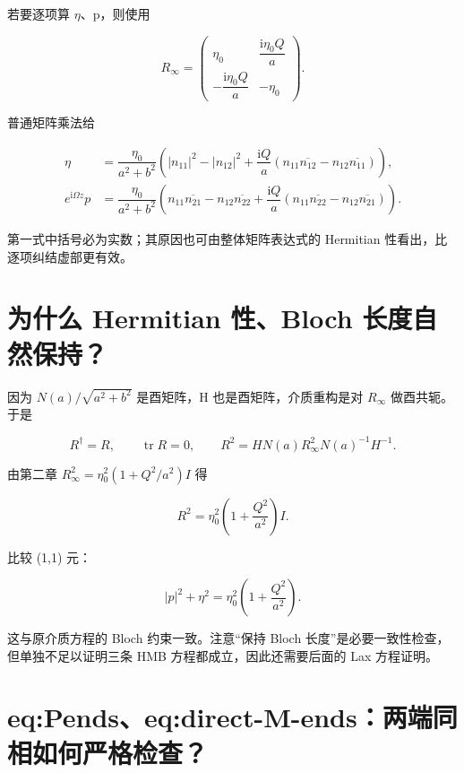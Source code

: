 若要逐项算 $\eta{}$、p，则使用\par

\[
R_\infty=
\begin{pmatrix}\eta_0&\dfrac{\mathrm{i}\eta_0Q}{a}\\
-\dfrac{\mathrm{i}\eta_0Q}{a}&-\eta_0\end{pmatrix}.
\]

普通矩阵乘法给\par

\[
\begin{aligned}
\eta
&=\dfrac{\eta_0}{a^2+b^2}
\left(
|n_{11}|^2-|n_{12}|^2
+\dfrac{\mathrm{i}Q}{a}
(n_{11}\overline{n_{12}}-n_{12}\overline{n_{11}})
\right),\\
e^{\mathrm{i}\Omega z}p
&=\dfrac{\eta_0}{a^2+b^2}
\left(
n_{11}\overline{n_{21}}-n_{12}\overline{n_{22}}
+\dfrac{\mathrm{i}Q}{a}
(n_{11}\overline{n_{22}}-n_{12}\overline{n_{21}})
\right).
\end{aligned}
\]

第一式中括号必为实数；其原因也可由整体矩阵表达式的 Hermitian 性看出，比逐项纠结虚部更有效。\par

\section{为什么 Hermitian 性、Bloch 长度自然保持？}

因为 $N(a)/\sqrt{a^{2}+b^{2}}$ 是酉矩阵，H 也是酉矩阵，介质重构是对 $R_{\infty}$ 做酉共轭。于是\par

\[
R^\dagger=R,\qquad
\operatorname{tr}R=0,\qquad
R^2=H N(a)R_\infty^2N(a)^{-1}H^{-1}.
\]

由第二章 $R_{\infty}^{2}=\eta{}_{0}^{2}(1+Q^{2}/a^{2})I$ 得\par

\[
R^2=\eta_0^2\left(1+\dfrac{Q^2}{a^2}\right)I.
\]

比较 (1,1) 元：\par

\[
|p|^2+\eta^2
=\eta_0^2\left(1+\dfrac{Q^2}{a^2}\right).
\]

这与原介质方程的 Bloch 约束一致。注意“保持 Bloch 长度”是必要一致性检查，但单独不足以证明三条 HMB 方程都成立，因此还需要后面的 Lax 方程证明。\par

\section{eq:Pends、eq:direct-M-ends：两端同相如何严格检查？}

